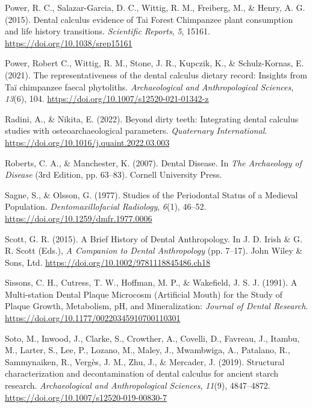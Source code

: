 \documentclass[
  letterpaper,
]{book}
\newlength{\cslhangindent}
\newlength{\cslentryspacingunit} %
\newenvironment{CSLReferences}[2] %
 {%
  \setlength{\parindent}{0pt}
  \ifodd #1
  \let\oldpar\par
  \def\par{\hangindent=\cslhangindent\oldpar}
  \fi
  \setlength{\parskip}{#2\cslentryspacingunit}
 }%
 {}
\begin{document}
\begin{CSLReferences}{1}{0}
\leavevmode{}%
Power, R. C., Salazar-Garcia, D. C., Wittig, R. M., Freiberg, M., \&
Henry, A. G. (2015). Dental calculus evidence of {Tai Forest Chimpanzee}
plant consumption and life history transitions. \emph{Scientific
Reports}, \emph{5}, 15161. \url{https://doi.org/10.1038/srep15161}

\leavevmode{}%
Power, Robert C., Wittig, R. M., Stone, J. R., Kupczik, K., \&
Schulz-Kornas, E. (2021). The representativeness of the dental calculus
dietary record: Insights from {Taï} chimpanzee faecal phytoliths.
\emph{Archaeological and Anthropological Sciences}, \emph{13}(6), 104.
\url{https://doi.org/10.1007/s12520-021-01342-z}

\leavevmode{}%
Radini, A., \& Nikita, E. (2022). Beyond dirty teeth: {Integrating}
dental calculus studies with osteoarchaeological parameters.
\emph{Quaternary International}.
\url{https://doi.org/10.1016/j.quaint.2022.03.003}

\leavevmode{}%
Roberts, C. A., \& Manchester, K. (2007). Dental {Disease}. In \emph{The
{Archaeology} of {Disease}} (3rd Edition, pp. 63--83). {Cornell
University Press}.

\leavevmode{}%
Sagne, S., \& Olsson, G. (1977). Studies of the {Periodontal Status} of
a {Medieval Population}. \emph{Dentomaxillofacial Radiology},
\emph{6}(1), 46--52. \url{https://doi.org/10.1259/dmfr.1977.0006}

\leavevmode{}%
Scott, G. R. (2015). A {Brief History} of {Dental Anthropology}. In J.
D. Irish \& G. R. Scott (Eds.), \emph{A {Companion} to {Dental
Anthropology}} (pp. 7--17). {John Wiley \& Sons, Ltd}.
\url{https://doi.org/10.1002/9781118845486.ch18}

\leavevmode{}%
Sissons, C. H., Cutress, T. W., Hoffman, M. P., \& Wakefield, J. S. J.
(1991). A {Multi-station Dental Plaque Microcosm} ({Artificial Mouth})
for the {Study} of {Plaque Growth}, {Metabolism}, {pH}, and
{Mineralization}: \emph{Journal of Dental Research}.
\url{https://doi.org/10.1177/00220345910700110301}

\leavevmode{}%
Soto, M., Inwood, J., Clarke, S., Crowther, A., Covelli, D., Favreau,
J., Itambu, M., Larter, S., Lee, P., Lozano, M., Maley, J., Mwambwiga,
A., Patalano, R., Sammynaiken, R., Vergès, J. M., Zhu, J., \& Mercader,
J. (2019). Structural characterization and decontamination of dental
calculus for ancient starch research. \emph{Archaeological and
Anthropological Sciences}, \emph{11}(9), 4847--4872.
\url{https://doi.org/10.1007/s12520-019-00830-7}


\end{CSLReferences}
\end{document}
